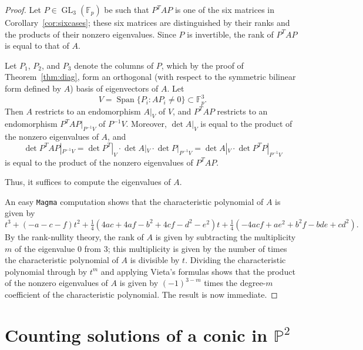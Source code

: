 \documentclass[10pt,a4paper]{amsart}
\numberwithin{equation}{section}
\numberwithin{figure}{section}
\theoremstyle{definition}
\theoremstyle{remark}
\theoremstyle{plain}
\theoremstyle{plain}
\theoremstyle{definition}
\theoremstyle{plain}
\theoremstyle{plain}
\renewcommand{\P}{\mathbb{P}}
\newcommand{\F}{\mathbb{F}}
\newcommand{\GL}{\operatorname{GL}}
\newcommand{\Span}{\operatorname{Span}}
\begin{document}
\begin{proof}
Let $P\in\GL_3(\F_p)$ be such that $P^TAP$ is one of the six matrices in Corollary~\ref{cor:sixcases}; these six matrices are distinguished by their ranks and the products of their nonzero eigenvalues. Since $P$ is invertible, the rank of $P^TAP$ is equal to that of $A$.

Let $P_1$, $P_2$, and $P_3$ denote the columns of $P$, which by the proof of Theorem~\ref{thm:diag}, form an orthogonal (with respect to the symmetric bilinear form defined by $A$) basis of eigenvectors of $A$. Let
\begin{equation*}
V=\Span\{P_i:AP_i\ne 0\}\subset\F_p^3.
\end{equation*}
Then $A$ restricts to an endomorphism $A|_V$ of $V$, and $P^TAP$ restricts to an endomorphism $P^TAP|_{P^{-1}V}$ of $P^{-1}V$. Moreover, $\det A|_V$ is equal to the product of the nonzero eigenvalues of $A$, and
\begin{equation*}
\det P^TAP|_{P^{-1}V}=\det P^T|_V\cdot\det A|_V\cdot\det P|_{P^{-1}V}=\det A|_V\cdot\det P^TP|_{P^{-1}V}
\end{equation*}
is equal to the product of the nonzero eigenvalues of $P^TAP$.

Thus, it suffices to compute the eigenvalues of $A$.

An easy \texttt{Magma} \cite{magma} computation shows that the characteristic polynomial of $A$ is given by
\begin{equation*}
t^3+(-a-c-f)t^2+\tfrac{1}{4}(4ac+4af-b^2+4cf-d^2-e^2)t+\tfrac{1}{4}(-4acf+ae^2+b^2f-bde+cd^2).
\end{equation*}
By the rank-nullity theory, the rank of $A$ is given by subtracting the multiplicity $m$ of the eigenvalue $0$ from $3$; this multiplicity is given by the number of times the characteristic polynomial of $A$ is divisible by $t$. Dividing the characteristic polynomial through by $t^m$ and applying Vieta's formulas shows that the product of the nonzero eigenvalues of $A$ is given by $(-1)^{3-m}$ times the degree-$m$ coefficient of the characteristic polynomial. The result is now immediate.
\end{proof}

    \section{Counting solutions of a conic in $\P^2$} 
\end{document}
